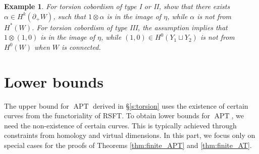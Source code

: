 \documentclass[11pt]{amsart}
\numberwithin{equation}{section}
\newtheorem{example}[theorem]{\textbf{Example}}
\DeclareMathOperator{\APT}{APT}
\begin{document}
\begin{example}
    For torsion cobordism of type I or II,  show that there exists $\alpha\in H^k(\partial_+W)$, such that $1\otimes \alpha$ is in the image of $\eta$, while $\alpha$ is not from $H^*(W)$. For torsion cobordism of type III, the assumption implies that $1\otimes (1,0)$ is in the image of $\eta$, while $(1,0)\in H^0(Y_1\sqcup Y_2)$ is not from $H^0(W)$ when $W$ is connected.  
\end{example}







\section{Lower bounds}\label{s:Lower}
The upper bound for $\APT$ derived in \S \ref{s:torsion} uses the existence of certain curves from the functoriality of RSFT. To obtain lower bounds for $\APT$, we need the non-existence of certain curves. This is typically achieved through constraints from homology and virtual dimensions. In this part, we focus only on special cases for the proofs of Theorems \ref{thm:finite_APT} and \ref{thm:finite_AT}.
\end{document}

